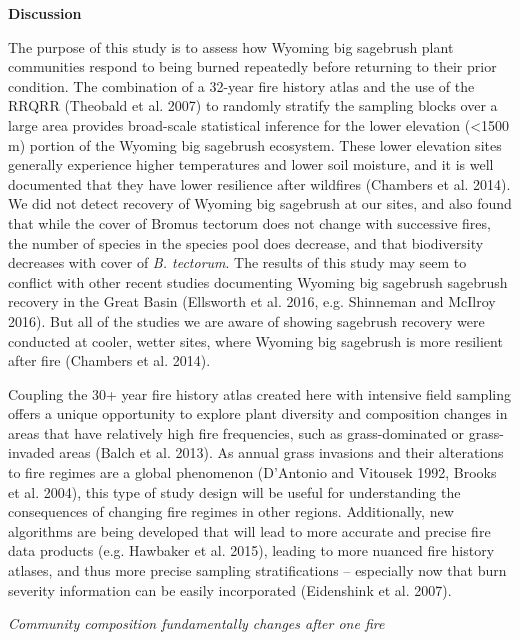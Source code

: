 \documentclass[12pt,]{article}
\begin{document}
\textbf{Discussion}

The purpose of this study is to assess how Wyoming big sagebrush plant
communities respond to being burned repeatedly before returning to their
prior condition. The combination of a 32-year fire history atlas and the
use of the RRQRR (Theobald et al. 2007) to randomly stratify the
sampling blocks over a large area provides broad-scale statistical
inference for the lower elevation (\textless{}1500 m) portion of the
Wyoming big sagebrush ecosystem. These lower elevation sites generally
experience higher temperatures and lower soil moisture, and it is well
documented that they have lower resilience after wildfires (Chambers et
al. 2014). We did not detect recovery of Wyoming big sagebrush at our
sites, and also found that while the cover of Bromus tectorum does not
change with successive fires, the number of species in the species pool
does decrease, and that biodiversity decreases with cover of \emph{B.
tectorum}. The results of this study may seem to conflict with other
recent studies documenting Wyoming big sagebrush sagebrush recovery in
the Great Basin (Ellsworth et al. 2016, e.g. Shinneman and McIlroy
2016). But all of the studies we are aware of showing sagebrush recovery
were conducted at cooler, wetter sites, where Wyoming big sagebrush is
more resilient after fire (Chambers et al. 2014).

Coupling the 30+ year fire history atlas created here with intensive
field sampling offers a unique opportunity to explore plant diversity
and composition changes in areas that have relatively high fire
frequencies, such as grass-dominated or grass-invaded areas (Balch et
al. 2013). As annual grass invasions and their alterations to fire
regimes are a global phenomenon (D'Antonio and Vitousek 1992, Brooks et
al. 2004), this type of study design will be useful for understanding
the consequences of changing fire regimes in other regions.
Additionally, new algorithms are being developed that will lead to more
accurate and precise fire data products (e.g. Hawbaker et al. 2015),
leading to more nuanced fire history atlases, and thus more precise
sampling stratifications -- especially now that burn severity
information can be easily incorporated (Eidenshink et al. 2007).

\emph{Community composition fundamentally changes after one fire}
\end{document}

